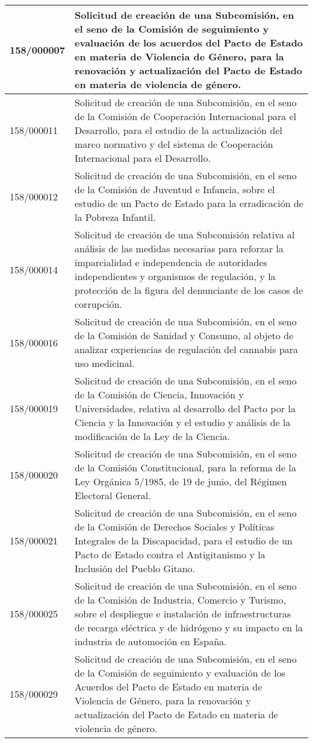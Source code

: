 {\begin{table}[H]
\begin{center}
\begin{tabularx}{\linewidth}{| l | X |}
\hline
158/000007 & Solicitud de creación de una Subcomisión, en el seno de la Comisión de seguimiento y evaluación de los acuerdos del Pacto de Estado en materia de Violencia de Género, para la renovación y actualización del Pacto de Estado en materia de violencia de género. \\
\hline
158/000011 & Solicitud de creación de una Subcomisión, en el seno de la Comisión de Cooperación Internacional para el Desarrollo, para el estudio de la actualización del marco normativo y del sistema de Cooperación Internacional para el Desarrollo. \\
\hline
158/000012 & Solicitud de creación de una Subcomisión, en el seno de la Comisión de Juventud e Infancia, sobre el estudio de un Pacto de Estado para la erradicación de la Pobreza Infantil. \\
\hline
158/000014 & Solicitud de creación de una Subcomisión relativa al análisis de las medidas necesarias para reforzar la imparcialidad e independencia de autoridades independientes y organismos de regulación, y la protección de la figura del denunciante de los casos de corrupción. \\
\hline
158/000016 & Solicitud de creación de una Subcomisión, en el seno de la Comisión de Sanidad y Consumo, al objeto de analizar experiencias de regulación del cannabis para uso medicinal. \\
\hline
158/000019 & Solicitud de creación de una Subcomisión, en el seno de la Comisión de Ciencia, Innovación y Universidades, relativa al desarrollo del Pacto por la Ciencia y la Innovación y el estudio y análisis de la modificación de la Ley de la Ciencia. \\
\hline
158/000020 & Solicitud de creación de una Subcomisión, en el seno de la Comisión Constitucional, para la reforma de la Ley Orgánica 5/1985, de 19 de junio, del Régimen Electoral General. \\
\hline
158/000021 & Solicitud de creación de una Subcomisión, en el seno de la Comisión de Derechos Sociales y Políticas Integrales de la Discapacidad, para el estudio de un Pacto de Estado contra el Antigitanismo y la Inclusión del Pueblo Gitano. \\
\hline
158/000025 & Solicitud de creación de una Subcomisión, en el seno de la Comisión de Industria, Comercio y Turismo, sobre el despliegue e instalación de infraestructuras de recarga eléctrica y de hidrógeno y su impacto en la industria de automoción en España. \\
\hline
158/000029 & Solicitud de creación de una Subcomisión, en el seno de la Comisión de seguimiento y evaluación de los Acuerdos del Pacto de Estado en materia de Violencia de Género, para la renovación y actualización del Pacto de Estado en materia de violencia de género. \\

\end{tabularx}
\end{center}
\end{table}}
